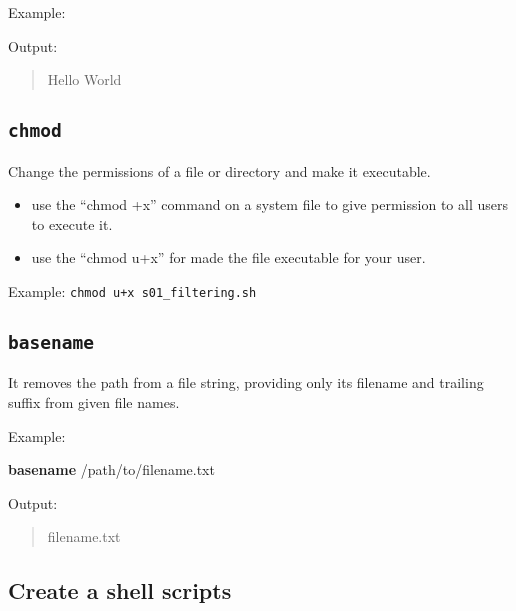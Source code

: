 \documentclass[
]{book}
\newenvironment{Shaded}{\begin{snugshade}}{\end{snugshade}}
\newcommand{\BuiltInTok}[1]{#1}
\newcommand{\FunctionTok}[1]{\textcolor[rgb]{0.13,0.29,0.53}{\textbf{#1}}}
\newcommand{\NormalTok}[1]{#1}
\newcommand{\OperatorTok}[1]{\textcolor[rgb]{0.81,0.36,0.00}{\textbf{#1}}}
\newcommand{\StringTok}[1]{\textcolor[rgb]{0.31,0.60,0.02}{#1}}
\newcommand{\VariableTok}[1]{\textcolor[rgb]{0.00,0.00,0.00}{#1}}
\providecommand{\tightlist}{%
  \setlength{\itemsep}{0pt}\setlength{\parskip}{0pt}}
\begin{document}
Example:

\begin{Shaded}
\end{Shaded}

Output:

\begin{quote}
Hello World
\end{quote}

\subsection{\texorpdfstring{\texttt{chmod}}{chmod}}\label{chmod}

Change the permissions of a file or directory and make it executable.

\begin{itemize}
\tightlist
\item
  use the ``chmod +x'' command on a system file to give permission to all users to execute it.
\item
  use the ``chmod u+x'' for made the file executable for your user.
\end{itemize}

Example: \texttt{chmod\ u+x\ s01\_filtering.sh}

\subsection{\texorpdfstring{\texttt{basename}}{basename}}\label{basename}

It removes the path from a file string, providing only its filename and trailing suffix from given file names.

Example:

\begin{Shaded}
\begin{Highlighting}[]
\FunctionTok{basename}\NormalTok{ /path/to/filename.txt}
\end{Highlighting}
\end{Shaded}

Output:

\begin{quote}
filename.txt
\end{quote}

\subsection{Create a shell scripts}\label{create-a-shell-scripts}
\end{document}
